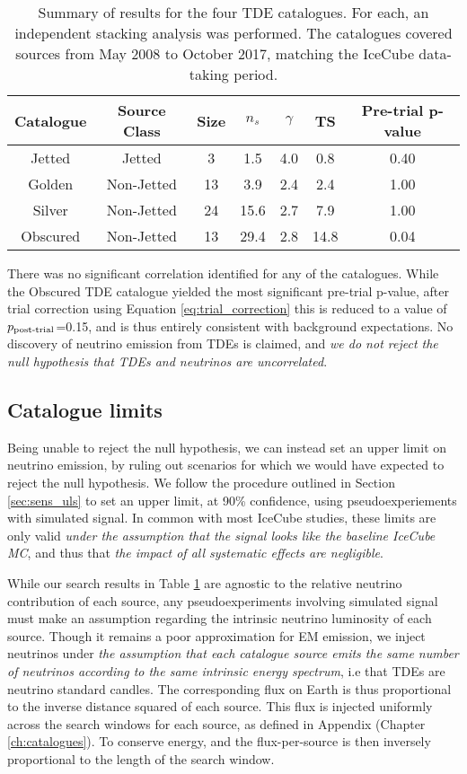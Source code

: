 \begin{table}[]
	\centering
	\begin{tabular}{||c c c| c c c | c||} 
		\hline
		Catalogue & Source Class & Size & $n_{s}$  & $\gamma$ & TS & Pre-trial p-value\\
		\hline\hline
		Jetted & Jetted &  3 & 1.5& 4.0&0.8&0.40\\ 
		\hline
		Golden & Non-Jetted & 13 &3.9&2.4& 2.4&1.00\\
		\hline
		Silver & Non-Jetted & 24 &15.6&2.7&7.9 & 1.00\\
		\hline
		Obscured & Non-Jetted & 13 &29.4&2.8&14.8& 0.04\\[1ex] 
		\hline
	\end{tabular}
	\caption{Summary of results for the four TDE catalogues. For each, an independent stacking analysis was performed. The catalogues covered sources from May 2008 to October 2017, matching the IceCube data-taking period.}
	\label{tab:stacking_tests}
\end{table}{}

There was no significant correlation identified for any of the catalogues. While the Obscured TDE catalogue yielded the most significant pre-trial p-value, after trial correction using Equation \ref{eq:trial_correction} this is reduced to a value of $p_{\textup{post-trial}}$=0.15, and is thus entirely consistent with background expectations. No discovery of neutrino emission from TDEs is claimed, and \emph{we do not reject the null hypothesis that TDEs and neutrinos are uncorrelated}.

\subsection*{Catalogue limits}

Being unable to reject the null hypothesis, we can instead set an upper limit on neutrino emission, by ruling out scenarios for which we would have expected to reject the null hypothesis. We follow the procedure outlined in Section \ref{sec:sens_uls} to set an upper limit, at 90\% confidence, using pseudoexperiements with simulated signal. In common with most IceCube studies, these limits are only valid \emph{under the assumption that the signal looks like the baseline IceCube MC}, and thus that \emph{the impact of all systematic effects are negligible}.

While our search results in Table \ref{tab:stacking_tests} are agnostic to the relative neutrino contribution of each source, any pseudoexperiments involving simulated signal must make an assumption regarding the intrinsic neutrino luminosity of each source. Though it remains a poor approximation for EM emission, we inject neutrinos under \emph{the assumption that each catalogue source emits the same number of neutrinos according to the same intrinsic energy spectrum}, i.e that TDEs are neutrino standard candles. The corresponding flux on Earth is thus proportional to the inverse distance squared of each source. This flux is injected uniformly across the search windows for each source, as defined in Appendix (Chapter \ref{ch:catalogues}). To conserve energy, and the flux-per-source is then inversely proportional to the length of the search window. 

